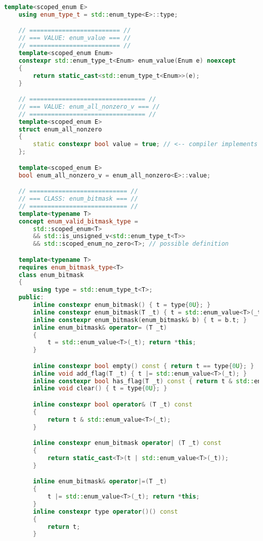 \documentclass[
  format=manuscript,
  screen=true,
  review=false,
  nonacm=true,
  timestamp=true,
  balance=false]{acmart}
\begin{document}
\begin{lstlisting}[language=Cpp]
    template<scoped_enum E>
    using enum_type_t = std::enum_type<E>::type;

    // ========================= //
    // === VALUE: enum_value === //
    // ========================= //
    template<scoped_enum Enum>
    constexpr std::enum_type_t<Enum> enum_value(Enum e) noexcept
    {
        return static_cast<std::enum_type_t<Enum>>(e);
    }

    // ================================ //
    // === VALUE: enum_all_nonzero_v === //
    // ================================ //
    template<scoped_enum E>
    struct enum_all_nonzero
    {
        static constexpr bool value = true; // <-- compiler implements this
    };

    template<scoped_enum E>
    bool enum_all_nonzero_v = enum_all_nonzero<E>::value;

    // =========================== //
    // === CLASS: enum_bitmask === //
    // =========================== //
    template<typename T>
    concept enum_valid_bitmask_type =
        std::scoped_enum<T>
        && std::is_unsigned_v<std::enum_type_t<T>>
        && std::scoped_enum_no_zero<T>; // possible definition

    template<typename T>
    requires enum_bitmask_type<T>
    class enum_bitmask
    {
        using type = std::enum_type_t<T>;
    public:
        inline constexpr enum_bitmask() { t = type{0U}; }
        inline constexpr enum_bitmask(T _t) { t = std::enum_value<T>(_t); }
        inline constexpr enum_bitmask(enum_bitmask& b) { t = b.t; }
        inline enum_bitmask& operator= (T _t)
        {
            t = std::enum_value<T>(_t); return *this;
        }

        inline constexpr bool empty() const { return t == type{0U}; }
        inline void add_flag(T _t) { t |= std::enum_value<T>(_t); }
        inline constexpr bool has_flag(T _t) const { return t & std::enum_value<T>(_t); }
        inline void clear() { t = type{0U}; }

        inline constexpr bool operator& (T _t) const
        {
            return t & std::enum_value<T>(_t);
        }

        inline constexpr enum_bitmask operator| (T _t) const
        {
            return static_cast<T>(t | std::enum_value<T>(_t));
        }

        inline enum_bitmask& operator|=(T _t)
        {
            t |= std::enum_value<T>(_t); return *this;
        }
        inline constexpr type operator()() const
        {
            return t;
        }


\end{lstlisting}
\end{document}
